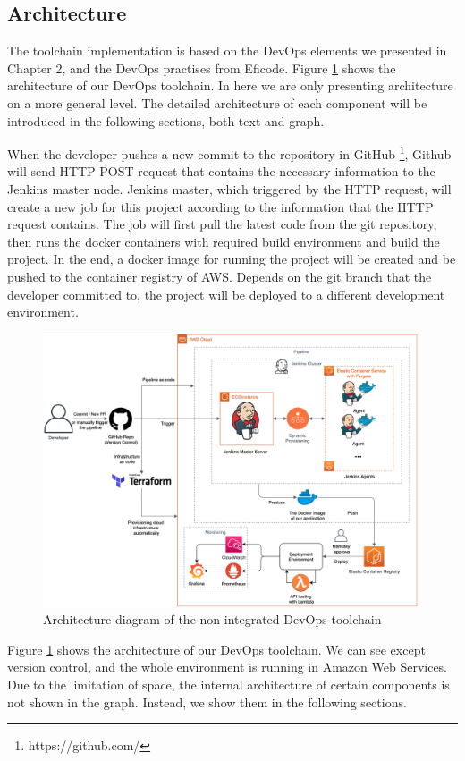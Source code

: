 \subsection{Architecture}
The toolchain implementation is based on the DevOps elements we presented in Chapter 2, and the DevOps practises from Eficode. Figure \ref{fig:archjenkins} shows the architecture of our DevOps toolchain. In here we are only presenting architecture on a more general level. The detailed architecture of each component will be introduced in the following sections, both text and graph.
\par
When the developer pushes a new commit to the repository in GitHub \footnote{https://github.com/}, Github will send HTTP POST request that contains the necessary information to the Jenkins master node. Jenkins master, which triggered by the HTTP request, will create a new job for this project according to the information that the HTTP request contains. The job will first pull the latest code from the git repository, then runs the docker containers with required build environment and build the project. In the end, a docker image for running the project will be created and be pushed to the container registry of AWS. Depends on the git branch that the developer committed to, the project will be deployed to a different development environment.
\begin{figure}[h]
     \centering
     \includegraphics[width=0.99\textwidth]{pics/arch-med-jenkins.png}
     \caption{Architecture diagram of the non-integrated DevOps toolchain}
     \label{fig:archjenkins}
     \end{figure}
\par
Figure \ref{fig:archjenkins} shows the architecture of our DevOps toolchain. We can see except version control, and the whole environment is running in Amazon Web Services. Due to the limitation of space, the internal architecture of certain components is not shown in the graph. Instead, we show them in the following sections.
